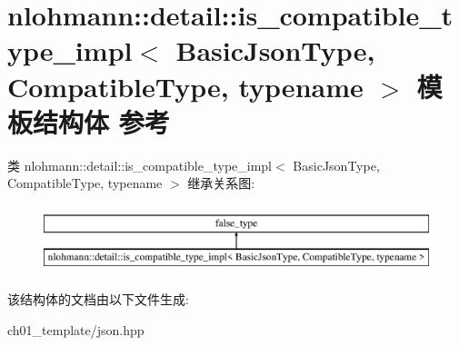 \hypertarget{structnlohmann_1_1detail_1_1is__compatible__type__impl}{}\section{nlohmann\+::detail\+::is\+\_\+compatible\+\_\+type\+\_\+impl$<$ Basic\+Json\+Type, Compatible\+Type, typename $>$ 模板结构体 参考}
\label{structnlohmann_1_1detail_1_1is__compatible__type__impl}
类 nlohmann\+::detail\+::is\+\_\+compatible\+\_\+type\+\_\+impl$<$ Basic\+Json\+Type, Compatible\+Type, typename $>$ 继承关系图\+:\begin{figure}[H]
\begin{center}
\leavevmode
\includegraphics[height=2.000000cm]{structnlohmann_1_1detail_1_1is__compatible__type__impl}
\end{center}
\end{figure}


该结构体的文档由以下文件生成\+:\begin{DoxyCompactItemize}
\item 
ch01\+\_\+template/json.\+hpp\end{DoxyCompactItemize}
